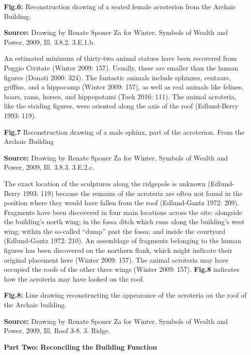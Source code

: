 \textbf{Fig.6:} Reconstruction drawing of a seated female acroterion
from the Archaic Building.

\textbf{Source:} Drawing by Renate Sponer Za for Winter, Symbols of
Wealth and Power, 2009, Ill. 3.8.2. 3.E.1.b.

An estimated minimum of thirty-two animal statues have been recovered
from Poggio Civitate (Winter 2009: 157). Usually, these are smaller than
the human figures (Donati 2000: 324). The fantastic animals include
sphinxes, centaurs, griffins, and a hippocamp (Winter 2009: 157), as
well as real animals like felines, boars, rams, horses, and hippopotami
(Tuck 2016: 111). The animal acroteria, like the striding figures, were
oriented along the axis of the roof (Edlund-Berry 1993: 119).

\textbf{Fig.7} Reconstruction drawing of a male sphinx, part of the
acroterion. From the Archaic Building

\textbf{Source:} Drawing by Renate Sponer Za for Winter, Symbols of
Wealth and Power, 2009, Ill. 3.8.3. 3.E.2.c.

The exact location of the sculptures along the ridgepole is unknown
(Edlund-Berry 1993: 119) because the remains of the acroteria are often
not found in the position where they would have fallen from the roof
(Edlund-Gantz 1972: 209). Fragments have been discovered in four main
locations across the site: alongside the building's north wing; in the
fossa ditch which runs along the building's west wing; within the
so-called ``dump'' past the fossa; and inside the courtyard
(Edlund-Gantz 1972: 210). An assemblage of fragments belonging to the
human figures has been discovered on the northern flank, which might
indicate their original placement here (Winter 2009: 157). The animal
acroteria may have occupied the roofs of the other three wings (Winter
2009: 157). \textbf{Fig.8} indicates how the acroteria may have looked
on the roof.

\textbf{Fig.8:} Line drawing reconstructing the appearance of the
acroteria on the roof of the Archaic building.

\textbf{Source:} Drawing by Renate Sponer Za for Winter, Symbols of
Wealth and Power, 2009, Ill. Roof 3-8. 3. Ridge.

\textbf{Part Two: Reconciling the} \textbf{Building Function}

